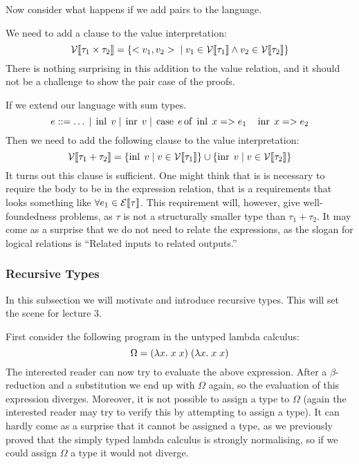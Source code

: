 Now consider what happens if we add pairs to the language. 
\begin{comment}
\begin{align*}
  &\fst <v_1,v_2> \evalto v_1 \\
  &\snd <v_1,v_2> \evalto v_2
\end{align*}
\end{comment}
We need to add a clause to the value interpretation:
\[
  \mathcal{V}\llbracket \tau_1 \times \tau_2 \rrbracket = \{<v_1,v_2> \; | \; v_1 \in \mathcal{V}\llbracket \tau_1 \rrbracket \wedge v_2 \in \mathcal{V}\llbracket \tau_2 \rrbracket\}
\]
There is nothing surprising in this addition to the value relation, and it should not be a challenge to show the pair case of the proofs.

If we extend our language with sum types. %
\[
e::= \dots \; | \; \operatorname{inl} \; v \; | \; \operatorname{inr} \; v \; | \; \operatorname{case} \; e \operatorname{of} \; \operatorname{inl} \; x => e_1 \quad \operatorname{inr} \; x => e_2
\]
Then we need to add the following clause to the value interpretation:
\[
  \mathcal{V}\llbracket \tau_1 + \tau_2 \rrbracket = \{\operatorname{inl} \; v \; | \; v \in \mathcal{V}\llbracket \tau_1 \rrbracket\} \cup
                           \{\operatorname{inr} \; v \; | \; v \in \mathcal{V}\llbracket \tau_2 \rrbracket\}
\]
It turns out this clause is sufficient. One might think that is is necessary to require the body to be in the expression relation, that is a requirements that looks something like $\forall e_1 \in \mathcal{E}\llbracket \tau \rrbracket$. This requirement will, however, give well-foundedness problems, as $\tau$ is not a structurally smaller type than $\tau_1 + \tau_2$. It may come as a surprise that we do not need to relate the expressions, as the slogan for logical relations is ``Related inputs to related outputs.''

\subsubsection*{Recursive Types}
In this subsection we will motivate and introduce recursive types. This will set the scene for lecture 3.

First consider the  following program in the untyped lambda calculus:
\[
  \Omega = (\lambda x . \; x \; x) \; (\lambda x . \; x \; x)
\]
The interested reader can now try to evaluate the above expression. After a $\beta$-reduction and a substitution we end up with $\Omega$ again, so the evaluation of this expression diverges. Moreover, it is not possible to assign a type to $\Omega$ (again the interested reader may try to verify this by attempting to assign a type). It can hardly come as a surprise that it cannot be assigned a type, as we previously proved that the simply typed lambda calculus is strongly normalising, so if we could assign $\Omega$ a type it would not diverge.

